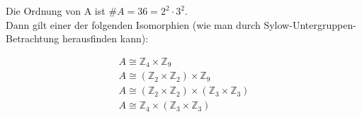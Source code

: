 \documentclass[11pt,a4paper,ngerman]{article}
\newcommand{\Z}{\mathbb{Z}}
\begin{document}
Die Ordnung von A ist $\#A = 36 = 2^2 \cdot 3^2$.\\
Dann gilt einer der folgenden Isomorphien (wie man durch Sylow-Untergruppen-Betrachtung herausfinden kann):

$$
\begin{array}{l}	
A \cong \Z_4 \times \Z_9 \\
A \cong (\Z_2 \times \Z_2) \times \Z_9  \\
A \cong (\Z_2 \times \Z_2) \times (\Z_3 \times \Z_3)  \\
A \cong \Z_4 \times (\Z_3 \times \Z_3)  \\
\end{array}
$$
\label{LastPage}
\end{document}
